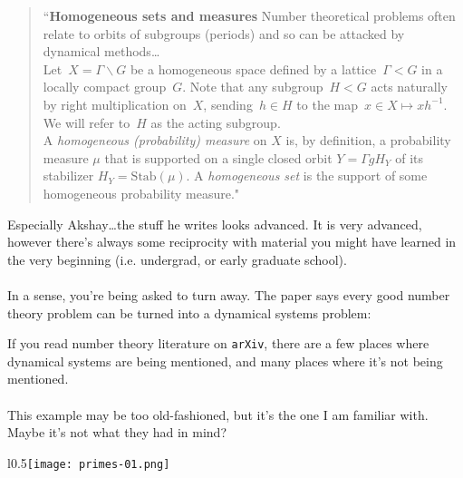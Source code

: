 \documentclass[12pt]{article}
\begin{document}
\begin{quotation}{ \color{black!90!white}
\noindent ``\textbf{Homogeneous sets and measures} Number theoretical problems often relate to orbits of subgroups (periods) and so can be attacked
by dynamical methods\dots \\

Let~$X=\Gamma\backslash G$ be a homogeneous space defined by a lattice~$\Gamma<G$
in a locally compact group~$G$. Note that any subgroup~$H<G$ acts naturally
by right multiplication on~$X$, sending~$h\in H$ to the map~$x\in X\mapsto xh^{-1}$. 
We will refer to~$H$ as the acting subgroup.  \\ 

A {\em homogeneous (probability) measure} on $X$ is, by definition, a probability measure $\mu$ that is supported
on a single closed orbit $Y=\Gamma g H_Y$ of its stabilizer $H_Y=\mathrm{Stab}(\mu)$. 
A {\em homogeneous set} is the support of some homogeneous probability measure." }
\end{quotation}
Especially Akshay\dots the stuff he writes looks advanced.  It is very advanced, however there's always some reciprocity with material you might have learned in the very beginning (i.e. undergrad, or early graduate school). \\ \\
In a sense, you're being asked to turn away.  The paper says every good number theory problem can be turned into a dynamical systems problem:\\
\begin{center}
\end{center}
If you read number theory literature on \texttt{arXiv}, there are a few places where dynamical systems are being mentioned, and many places where it's not being mentioned. \\\\
This example may be too old-fashioned, but it's the one I am familiar with.  Maybe it's not what they had in mind? \\
\begin{wrapfigure}{l}{0.5\linewidth}\texttt{[image: primes-01.png]} 
\end{wrapfigure}
\end{document}
